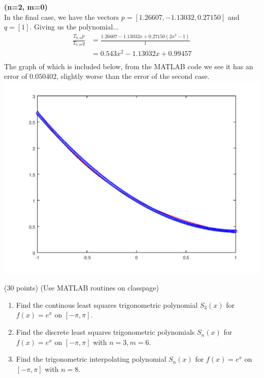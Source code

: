 \documentclass[10pt]{jhwhw}
\begin{document}
	\clearpage
	\textbf{(n=2, m=0)} \\
	In the final case, we have the vectors
	$p=[1.26607, -1.13032, 0.27150]$ and $q=[1]$.
	Giving us the polynomial... \\
	\begin{align*}
		\frac{T_{0,n}p}{T_{0,m}q} &= \frac{1.26607 - 1.13032x + 0.27150(2x^2-1)}{1} \\
		&= 0.543x^2 - 1.13032x + 0.99457 \\
	\end{align*}
	The graph of which is included below, from the MATLAB code we see it has an error
	of $0.050402$, slightly worse than the error of the second case.
	\includegraphics[scale=0.75]{p4c}

\problem{} (30 points) (Use MATLAB routines on classpage)

	\begin{enumerate}
		\item Find the continous least squares trigonometric polynomial $S_3(x)$ for
			$f(x) = e^x$ on $[-\pi,\pi]$.
		\item Find the discrete least squares trigonometric polynomials $S_n(x)$ for
			$f(x) = e^x$ on $[-\pi, \pi]$ with $n=3, m=6$.
		\item Find the trigonometric interpolating polynomial $S_n(x)$ for 
			$f(x) = e^x$ on $[-\pi, \pi]$ with $n=8$.
	\end{enumerate}

\solution
\end{document}
